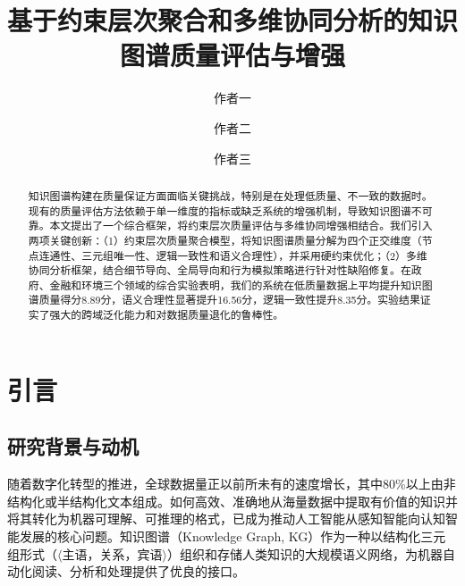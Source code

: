 \documentclass[runningheads]{llncs}
\begin{document}
\title{基于约束层次聚合和多维协同分析的知识图谱质量评估与增强}


\author{作者一 \and
作者二 \and
作者三}



\maketitle

\begin{abstract}
知识图谱构建在质量保证方面面临关键挑战，特别是在处理低质量、不一致的数据时。现有的质量评估方法依赖于单一维度的指标或缺乏系统的增强机制，导致知识图谱不可靠。本文提出了一个综合框架，将约束层次质量评估与多维协同增强相结合。我们引入两项关键创新：（1）约束层次质量聚合模型，将知识图谱质量分解为四个正交维度（节点连通性、三元组唯一性、逻辑一致性和语义合理性），并采用硬约束优化；（2）多维协同分析框架，结合细节导向、全局导向和行为模拟策略进行针对性缺陷修复。在政府、金融和环境三个领域的综合实验表明，我们的系统在低质量数据上平均提升知识图谱质量得分8.89分，语义合理性显著提升16.56分，逻辑一致性提升8.35分。实验结果证实了强大的跨域泛化能力和对数据质量退化的鲁棒性。

\end{abstract}

\section{引言}

\subsection{研究背景与动机}
随着数字化转型的推进，全球数据量正以前所未有的速度增长，其中80\%以上由非结构化或半结构化文本组成。如何高效、准确地从海量数据中提取有价值的知识并将其转化为机器可理解、可推理的格式，已成为推动人工智能从感知智能向认知智能发展的核心问题。知识图谱（Knowledge Graph, KG）作为一种以结构化三元组形式（$\langle$主语，关系，宾语$\rangle$）组织和存储人类知识的大规模语义网络，为机器自动化阅读、分析和处理提供了优良的接口。
\end{document}
